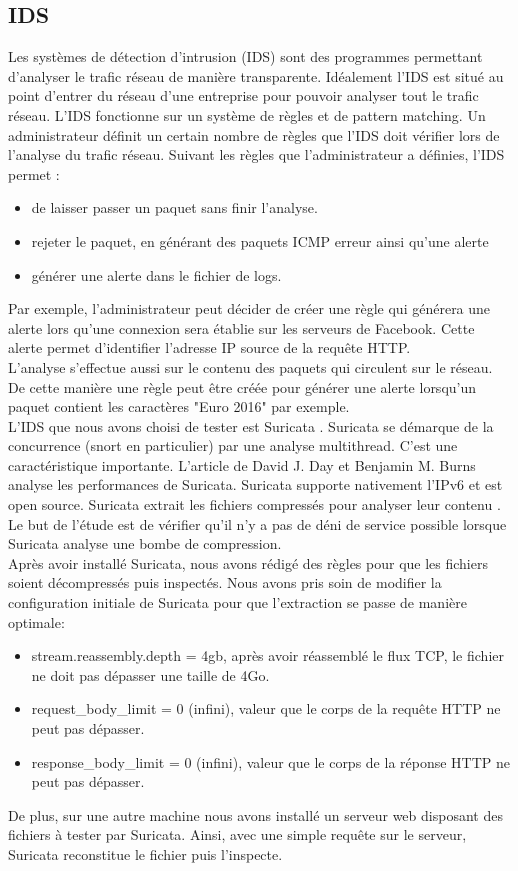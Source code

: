 \documentclass{svjour3}
\begin{document}
\subsection{IDS}
\label{2.3ids}
Les systèmes de détection d'intrusion (IDS) sont des programmes permettant d'analyser le trafic réseau de manière transparente. Idéalement l'IDS est situé au point d'entrer du réseau d'une entreprise pour pouvoir analyser tout le trafic réseau. L'IDS fonctionne sur un système de règles et de pattern matching. Un administrateur définit un certain nombre de règles que l'IDS doit vérifier lors de l'analyse du trafic réseau. Suivant les règles que l’administrateur a définies, l'IDS permet :
\begin{itemize}
\item de laisser passer un paquet sans finir l'analyse.
\item rejeter le paquet, en générant des paquets ICMP erreur ainsi qu'une alerte
\item générer une alerte dans le fichier de logs.
\end{itemize} 
Par exemple, l'administrateur peut décider de créer une règle  qui générera une alerte lors qu'une connexion sera établie sur les serveurs de Facebook. Cette alerte permet d'identifier l'adresse IP source de la requête HTTP.\\
L'analyse s'effectue aussi sur le contenu des paquets qui circulent sur le réseau. De cette manière une règle peut être créée pour générer une alerte lorsqu'un paquet contient les caractères "Euro 2016" par exemple.\\
L'IDS que nous avons choisi de tester est Suricata \cite{Suricata}. Suricata se démarque de la concurrence (snort en particulier) par une analyse multithread. C'est une caractéristique importante. L'article de David J. Day et Benjamin M. Burns \cite{PerformanceAnalysis}  analyse les performances de Suricata. Suricata supporte nativement l'IPv6 et est open source. Suricata extrait les fichiers compressés pour analyser leur contenu \cite{SuricataExtraction}. Le but de l’étude est de vérifier qu'il n'y a pas de déni de service possible lorsque Suricata analyse une bombe de compression.\\
Après avoir installé Suricata, nous avons rédigé des règles pour que les fichiers soient décompressés puis inspectés. Nous avons pris soin de modifier la configuration initiale de Suricata pour que l'extraction se passe de manière optimale:
\begin{itemize}
\item stream.reassembly.depth = 4gb, après avoir réassemblé le flux TCP, le fichier ne doit pas dépasser une taille de 4Go.
\item request\_body\_limit = 0 (infini), valeur que le corps de la requête HTTP ne peut pas dépasser.
\item response\_body\_limit = 0 (infini), valeur que le corps de la réponse HTTP ne peut pas dépasser.
\end{itemize}
De plus, sur une autre machine nous avons installé un serveur web disposant des fichiers à tester par Suricata. Ainsi, avec une simple requête sur le serveur, Suricata reconstitue le fichier puis l'inspecte.
\end{document}
